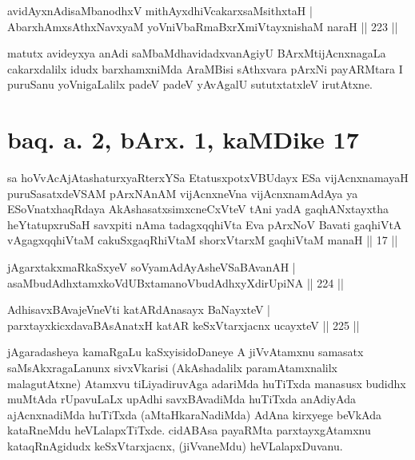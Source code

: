 \begin{shl}
avidAyxnAdisaMbanodhxV mithAyxdhiVcakarxsaMsithxtaH |\\
AbarxhAmx\s \s sAthxNavxyaM yoVniVbaRmaBxrXmiVtayxnishaM naraH \hfill || 223 ||
\end{shl}

\begin{artha}
matutx avideyxya anAdi saMbaMdhavidadxvanAgiyU BArxMtijAcnxnagaLa cakarxdalilx idudx barxhamxniMda AraMBisi sAthxvara pArxNi payARMtara I puruSanu yoVnigaLalilx padeV padeV yAvAgalU sututxtatxleV irutAtxne.
\end{artha}

\section*{baq. a. 2, bArx. 1, kaMDike 17}

\begin{shl}
sa hoVvAcAjAtashaturxyaRterxYSa EtatusxpotxV\s BUdayx ESa vijAcnxnamayaH puruSasatxdeVSAM pArxNAnAM vijAcnxneVna vijAcnxnamAdAya ya ESoV\s natxhaqRdaya AkAshasatxsimxcneCxVteV tAni yadA gaqhANxtayxtha heYtatupxruSaH savxpiti nAma tadagxqqhiVta Eva pArxNoV Bavati gaqhiVtA vAgagxqqhiVtaM cakuSxgaqRhiVtaM shorxVtarxM gaqhiVtaM manaH || 17 ||
\end{shl}


\begin{shl}
jAgarxtakxmaRkaSxyeV soV\s yamAdAyAsheVSaBAvanAH |\\
asaMbudAdhxtamxkoVdUBxtamanoVbudAdhxyXdirUpiNA \hfill || 224 ||
\end{shl}
\begin{shl}
\footnotemark AdhisavxBAvajeVneVti katAR\s \s dAnasayx BaNayxteV |\\
parxtayxkicxdavaBAsAnatxH katAR keSxVtarxjacnx ucayxteV \hfill || 225 ||
\end{shl}

\begin{artha}
jAgaradasheya kamaRgaLu kaSxyisidoDaneye A jiVvAtamxnu samasatx saMsAkxragaLanunx sivxVkarisi (AkAshadalilx paramAtamxnalilx malagutAtxne) Atamxvu tiLiyadiruvAga adariMda huTiTxda manasusx budidhx muMtAda rUpavuLaLx upAdhi savxBAvadiMda huTiTxda anAdiyAda ajAcnxnadiMda huTiTxda (aMtaHkaraNadiMda) AdAna kirxyege beVkAda kataRneMdu heVLalapxTiTxde. cidABAsa payaRMta parxtayxgAtamxnu kataqRnAgidudx keSxVtarxjacnx, (jiVvaneMdu) heVLalapxDuvanu.
\end{artha}

